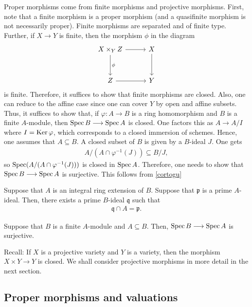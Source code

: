 \documentclass [11 pt, oneside] {article}
\begin{document}
Proper morphisms come from finite morphisms and projective morphisms. First, note that a finite morphism is a proper morphism (and a quasifinite morphism is not necessarily proper). Finite morphisms are separated and of finite type. Further, if $X\longrightarrow Y$ is finite, then the morphism $\phi$ in the diagram
\[
\begin{tikzcd}[row sep = 3 em, column sep = 3 em]
	X\times_Y Z \ar[r]\ar[d,"\phi"] &X\ar[d]\\ Z\ar[r]&Y
\end{tikzcd}
\]
is finite. Therefore, it suffices to show that finite morphisms are closed. Also, one can reduce to the affine case since one can cover $Y$ by open and affine subsets. Thus, it suffices to show that, if $\varphi: A\longrightarrow B$ is a ring homomorphism and $B$ is a finite $A$-module, then $\operatorname{Spec} B\longrightarrow \operatorname{Spec} A$ is closed. One factors this as $A\longrightarrow A/I$ where $I=\operatorname{Ker} \varphi$, which corresponds to a closed immersion of schemes. Hence, one assumes that $A\subseteq B$. A closed subset of $B$ is given by a $B$-ideal $J$. One gets
\begin{align*}
	A/(A\cap \varphi^{-1}(J)) \subseteq B/J,
\end{align*}
so $\operatorname{Spec} (A/(A\cap \varphi^{-1}(J)))$ is closed in $\operatorname{Spec} A$. Therefore, one needs to show that $\operatorname{Spec} B\longrightarrow \operatorname{Spec} A$ is surjective. This follows from \cref{cortogu}

\begin{theorem}\label{goingup}\text{}
Suppose that $A$ is an integral ring extension of $B$. Suppose that $\mathfrak{p}$ is a prime $A$-ideal. Then, there exists a prime $B$-ideal $\mathfrak{q}$ such that 
\begin{align*}
	\mathfrak{q}\cap A = \mathfrak{p}.
\end{align*}
\end{theorem}

\begin{corollary}\label{cortogu}
	Suppose that $B$ is a finite $A$-module and $A\subseteq B$. Then, $\operatorname{Spec} B\longrightarrow \operatorname{Spec} A$ is surjective. 
\end{corollary}

Recall: If $X$ is a projective variety and $Y$ is a variety, then the morphism $X\times Y\longrightarrow Y$ is closed. We shall consider projective morphisms in more detail in the next section.

\subsection{Proper morphisms and valuations}
\end{document}
